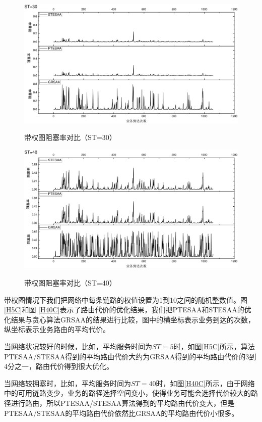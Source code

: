 \begin{figure}
\vspace{-0.1cm}
\setlength{\abovecaptionskip}{-0.5cm}
\begin{center}
{\includegraphics[width=0.8 \textwidth]{figures/H30Z.pdf}}
\end{center}
\caption{{\footnotesize{带权图阻塞率对比（ST=30）}}}
\label{H30Z}
\end{figure}
\begin{figure}
\vspace{-0.1cm}
\setlength{\abovecaptionskip}{-0.5cm}
\begin{center}
{\includegraphics[width=0.8 \textwidth]{figures/H40Z.pdf}}
\end{center}
\caption{{\footnotesize{带权图阻塞率对比（ST=40）}}}
\label{H40Z}
\end{figure}
带权图情况下我们把网络中每条链路的权值设置为1到10之间的随机整数值。图 \ref{H5C}和图 \ref{H40C}表示了路由代价的优化结果，我们把PTESAA和STESAA的优化结果与贪心算法GRSAA的结果进行比较，图中的横坐标表示业务到达的次数，纵坐标表示业务路由的平均代价。

当网络状况较好的时候，比如，平均服务时间为$ST=5$时，如图\ref{H5C}所示，算法PTESAA/STESAA得到的平均路由代价大约为GRSAA得到的平均路由代价的3到4分之一，路由代价得到很大优化。

当网络较拥塞时，比如，平均服务时间为$ST=40$时，如图\ref{H40C}所示，由于网络中的可用链路变少，业务的路径选择空间变小，使得业务可能会选择代价较大的路径进行路由，所以PTESAA/STESAA算法得到的平均路由代价变大，但是PTESAA/STESAA的平均路由代价依然比GRSAA的平均路由代价小很多。

